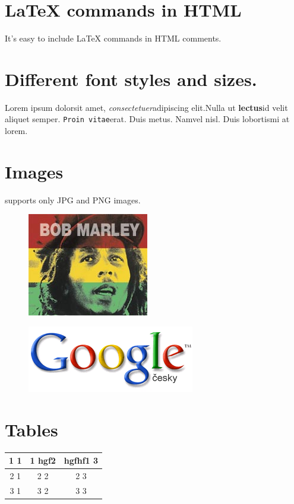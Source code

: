 \documentclass{article}
\begin{document}
\section{LaTeX commands in HTML}
\par It's easy to include LaTeX commands in HTML comments.
\section{Different font styles and sizes.}
\par Lorem ipsum 
{\huge dolor}sit amet, 
\textit{consectetuer}adipiscing elit.Nulla ut 
\textbf{lectus}id velit aliquet semper. 
\texttt{Proin vitae}erat. Duis metus. Namvel nisl. Duis 
\small{lobortis}mi at 
{\scriptsize lorem}.
\label{img}
\section{Images}
\par supports only JPG and PNG images.
\par 
\begin{center}
\begin{figure}[h]
\includegraphics{marley.jpg}
\end{figure}
\end{center}
\par 
\begin{figure}[h]
\includegraphics{logo.png}
\end{figure}
\section{Tables}

\begin{tabular}{ |c|c|c| }
\hline
 1 1 & 1 hgf2 & hgfhf1 3 \\ 
\hline
 2 1 & 2 2 & 2 3 \\ 
\hline
 3 1 & 3 2 & 3 3 \\ 
\hline

\hline
\end{tabular}
\end{document}
